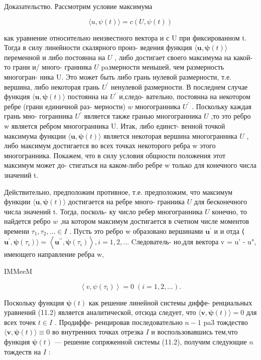 \documentclass[8pt]{extarticle}
\begin{document}
Доказательство. Рассмотрим условие максимума

\[
\langle u,\psi \left( t\right) \rangle  = c\left( {U,\psi \left( t\right) }\right) \tag{12.9}
\]

как уравнение относительно неизвестного вектора и с U при фиксированном t. Тогда в силу линейности скалярного произ- ведения функция \(\langle \mathbf{u},\mathbf{\psi }\left( t\right) \rangle\) переменной и либо постоянна на \(U\) , либо достигает своего максимума на какой-то грани и/ много- гранника \(U\) paзмерности меньшей, чем размерность многогран- ника U. Это может быть либо грань нулевой размерности, т.е. вершина, либо некоторая грань \({U}^{\prime }\) ненулевой размерности. В последнем случае функция \(\langle \mathbf{u},\mathbf{\psi }\left( t\right) \rangle\) постоянна на \({U}^{\prime }\) и,следо- вательно, постоянна на некотором ребре (грани единичной раз- мерности) \(w\) многогранника \({U}^{\prime }\) . Поскольку каждая грань мно- гогранника \({U}^{\prime }\) является также гранью многогранника \(U\) ,то это ребро w является ребром многогранника U. Итак, либо единст- венной точкой максимума функции \(\langle \mathbf{u},\mathbf{\psi }\left( t\right) \rangle\) является некоторая вершина многогранника \(U\) , либо максимум достигается во всех точках некоторого ребра w этого многогранника. Покажем, что в силу условия общности положения этот максимум может до- стигаться на каком-либо ребре w только для конечного числа значений t.

Действительно, предположим противное, т.е. предположим, что максимум функции \(\langle \mathbf{u},\mathbf{\psi }\left( t\right) \rangle\) достигается на ребре много- гранника \(U\) для бесконечного числа значений t. Тогда, посколь- ку число ребер многогранника \(U\) конечно, то найдется ребро \(w\) ,на котором максимум достигается в счетном числе моментов времени \({\tau }_{1},{\tau }_{2},\ldots  \in  I\) . Пусть это ребро w образовано вершинами \({\mathbf{u}}^{\prime }\) и и отда ⟨ \({\mathbf{u}}^{\prime },\mathbf{\psi }\left( {\tau }_{i}\right) \rangle  = \left\langle  {{\mathbf{u}}^{\prime \prime },\dot{\mathbf{\psi }}\left( {\tau }_{i}\right) }\right\rangle  ,i = 1,2,\ldots\) Cледователь- но,для вектора v = u' - u", имеющего направление ребра w,

IMMeeM

\[
\left\langle  {v,\psi \left( {\tau }_{i}\right) }\right\rangle   = 0\;\left( {i = 1,2,\ldots }\right) .
\]

Поскольку функция \(\mathbf{\psi }\left( t\right)\) как решение линейной системы диффе- ренциальных уравнений (11.2) является аналитической, отсюда следует, что \(\langle \mathbf{v},\mathbf{\psi }\left( t\right) \rangle  = 0\) для всех точек \(t \in  I\) . Продиффе- ренцировав последовательно \(n - 1\) pa3 тождество \(\langle \mathbf{v},\mathbf{\psi }\left( t\right) \rangle  \equiv  0\) во внутренних точках отрезка \(I\) и воспользовавшись тем,что функция \(\mathbf{\psi }\left( t\right)\) — решение сопряженной системы (11.2), получим следующие \(n\) тождеств на \(I\) :
\end{document}
